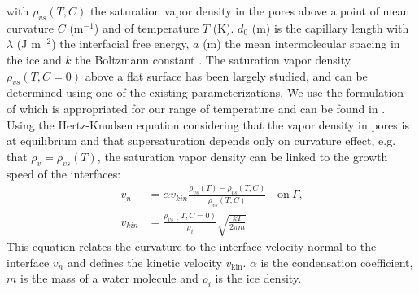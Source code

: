 \documentclass[draft,ms]{agujournal2019}
\begin{document}
\noindent with $\rho_{vs}(T, C)$ the saturation vapor density in the pores above a point of mean curvature $C$ (m$^{-1}$) and of temperature $T$ (K). $d_0$ (m) is the capillary length with $\lambda$ (J m$^{-2}$) the interfacial free energy, $a$ (m) the mean intermolecular spacing in the ice and $k$ the Boltzmann constant \cite{kaempfer_phase-field_2009}. The saturation vapor density $\rho_{vs}(T, C=0)$ above a flat surface has been largely studied, and can be determined using one of the existing parameterizations. We use the formulation of  which is appropriated for our range of temperature and can be found in .\\
Using the Hertz-Knudsen equation considering that the vapor density in pores is at equilibrium and that supersaturation depends only on curvature effect, e.g. that $\rho_v = \rho_{vs}(T)$, the saturation vapor density can be linked to the growth speed of the interfaces:\\
\begin{align}
v_{n} &= \alpha v_{k i n} \frac{\rho_{vs}(T) - \rho_{v s}(T, C)}{\rho_{v s}(T, C)}\quad \text{on}\ \Gamma\text{,} \\
v_{k i n} &= \frac{\rho_{v s}(T, C=0)}{\rho_i}\sqrt{\frac{k T}{2 \pi m}} %
\end{align}
\label{eq:hertz_knu}
This equation relates the curvature to the interface velocity normal to the interface $v_n$ and defines the kinetic velocity $v_{\mathrm{kin}}$. $\alpha$ is the condensation coefficient, $m$ is the mass of a water molecule and $\rho_i$ is the ice density. 
\end{document}
